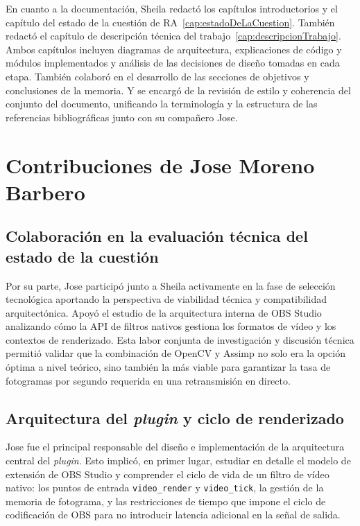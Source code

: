En cuanto a la documentación, Sheila redactó los capítulos introductorios y el capítulo del estado de la cuestión de RA~\ref{cap:estadoDeLaCuestion}. También redactó el capítulo de descripción técnica del trabajo~\ref{cap:descripcionTrabajo}. Ambos capítulos incluyen diagramas de arquitectura, explicaciones de código y módulos implementados y análisis de las decisiones de diseño tomadas en cada etapa. También colaboró en el desarrollo de las secciones de objetivos y conclusiones de la memoria. Y se encargó de la revisión de estilo y coherencia del conjunto del documento, unificando la terminología y la estructura de las referencias bibliográficas junto con su compañero Jose.

\section*{Contribuciones de Jose Moreno Barbero}

\subsection*{Colaboración en la evaluación técnica del estado de la cuestión}

Por su parte, Jose participó junto a Sheila activamente en la fase de selección tecnológica aportando la perspectiva de viabilidad técnica y compatibilidad arquitectónica.
Apoyó el estudio de la arquitectura interna de OBS Studio analizando cómo la API de filtros nativos gestiona los formatos de vídeo y los contextos de renderizado. Esta labor conjunta de investigación y discusión técnica permitió validar que la combinación de OpenCV y Assimp no solo era la opción óptima a nivel teórico, sino también la más viable para garantizar la tasa de fotogramas por segundo requerida en una retransmisión en directo.

\subsection*{Arquitectura del \textit{plugin} y ciclo de renderizado}

Jose fue el principal responsable del diseño e implementación de la arquitectura central del \textit{plugin}. Esto implicó, en primer lugar, estudiar en detalle el modelo de extensión de OBS Studio y comprender el ciclo de vida de un filtro de vídeo nativo: los puntos de entrada \texttt{video\_render} y \texttt{video\_tick}, la gestión de la memoria de fotograma, y las restricciones de tiempo que impone el ciclo de codificación de OBS para no introducir latencia adicional en la señal de salida.


